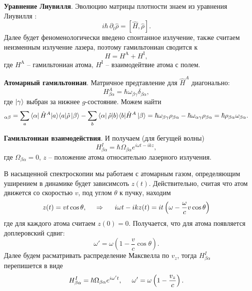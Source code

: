 \textbf{Уравнение Лиувилля}. 
Эволюцию матрицы плотности знаем из уравнения Лиувилля \cite{mandel_wolf_1995}:
\begin{equation}
    i \hbar\, \partial_t \hat{\rho} = [\hat{H}, \hat{\rho}].
    \label{master_eq}
\end{equation}
Далее будет феноменологически введено спонтанное излучение, также считаем неизменным излучение лазера, поэтому гамильтониан сводится к
\begin{equation*}
    H = H^{\text{A}} + H^{\text{I}},
\end{equation*}
где $H^{\text{A}}$ -- гамильтониан атома, $H^{\text{I}}$ -- взаимодейтвие атома с полем.



\textbf{Атомарный гамильтониан}. Матричное предтавление для $\hat{H}^A$ диагонально:
\begin{equation*}
    H^A_{\beta \alpha} = \hbar \omega_{\beta \gamma} \delta_{\beta \alpha},
\end{equation*}
где $\left| \gamma \right\rangle$ выбран за нижнее $g$-состояние. Можем найти
\begin{equation*}
    [H^A,\, \hat{\rho}]_{\alpha\beta} = \sum_{a} \bra{\alpha} \hat{H}^A \kb{a}{a} \hat{\rho} \ket{\beta} - \sum_b \bra{\alpha} \hat{\rho} \kb{b}{b} \hat{H}^A \ket{\beta} = \hbar \omega_{\beta \gamma} \rho_{\beta \alpha} - \hbar \omega_{\alpha \gamma} \rho_{\beta \alpha} = \hbar \rho_{\beta \alpha} \omega_{\beta \alpha}.
\end{equation*}


\textbf{Гамильтониан взаимодействия}.  И получаем (для бегущей волны)
\begin{equation*}
    H^I_{\beta \alpha} = \hbar \Omega_{\beta \alpha} e^{i \omega t - i k z},
\end{equation*}
где $\Omega_{\beta \alpha} = 0$, $z$ -- положение атома относительно лазерного излучения.

В насыщенной спектроскопии мы работаем с атомарным газом, определяющим уширением в динамике будет зависимсоть $z(t)$. Действительно, считая что атом движется со скоростью $v$, под углом $\theta$ к пучку, находим
\begin{equation*}
    z(t) = v t \cos \theta,
    \hspace{0.5cm} \Rightarrow \hspace{0.5cm}
    i \omega t - i k z(t) = i t \left(\omega - \frac{\omega}{c} v \cos \theta\right)
\end{equation*}
где для каждого атома считаем $z(0)=0$. Получается, что для атома появляется доплеровский сдвиг:
\begin{equation*}
    \omega' = \omega \left(1 - \frac{v}{c}\cos \theta\right).
\end{equation*}
Далее будем расматривать распределение Максвелла по $v_z$, тогда $H^I_{\beta \alpha}$ перепишется в виде
\begin{equation*}
    H^I_{\beta \alpha} = \hbar \Omega_{\beta \alpha} e^{i \omega' t},
    \hspace{5 mm} 
    \omega' = \omega\left(1 - \frac{v_z}{c}\right).
\end{equation*}


